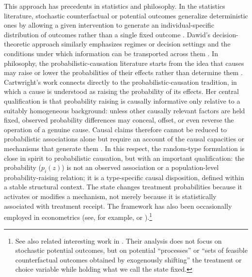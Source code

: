 \documentclass[11pt]{article}
\newcommand{\1}{\mathbf{1}}
\begin{document}
This approach has precedents in statistics and philosophy. In the statistics literature, stochastic counterfactual or potential outcomes generalize deterministic ones by allowing a given intervention to generate an individual-specific distribution of outcomes rather than a single fixed outcome \citep{greenland1987,robinsgreenland1989,robinsgreenland2000,vanderweelerobins2012}. Dawid's decision-theoretic approach similarly emphasizes regimes or decision settings and the conditions under which information can be transported across them \citep{dawid2000,dawid2021}. In philosophy, the probabilistic-causation literature starts from the idea that causes may raise or lower the probabilities of their effects rather than determine them \citep{hitchcock2023}. Cartwright’s work connects directly to the probabilistic-causation tradition, in which a cause is understood as raising the probability of its effects. Her central qualification is that probability raising is causally informative only relative to a suitably homogeneous background: unless other causally relevant factors are held fixed, observed probability differences may conceal, offset, or even reverse the operation of a genuine cause. Causal claims therefore cannot be reduced to probabilistic associations alone but require an account of the causal capacities or mechanisms that generate them \citep{cartwright1979,cartwright1989}. In this respect, the random-type formulation is close in spirit to probabilistic causation, but with an important qualification: the probability ($p_i(z)$) is not an observed association or a population-level probability-raising relation; it is a type-specific causal disposition, defined within a stable structural context. The state changes treatment probabilities because it activates or modifies a mechanism, not merely because it is statistically associated with treatment receipt. The framework has also been occasionally employed in econometrics (see, for example, \cite{abbringvandenberg2003} or \cite{dinardolee2011}).\footnote{See also related interesting work in \cite{chesher2021counterfactual}. Their analysis does not focus on stochastic potential outcomes, but on potential ``processes'' or ``sets of feasible counterfactual outcomes obtained by exogenously shifting'' the treatment or choice variable while holding what we call the state fixed. } 
\end{document}
